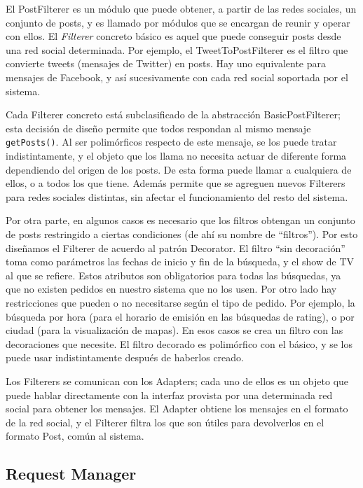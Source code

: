 El PostFilterer es un módulo que puede obtener, a partir de las redes sociales, un conjunto de posts, y es llamado por módulos que se encargan de reunir y operar con ellos. El \emph{Filterer} concreto básico es aquel que puede conseguir posts desde una red social determinada. Por ejemplo, el TweetToPostFilterer es el filtro que convierte tweets (mensajes de Twitter) en posts. Hay uno equivalente para mensajes de Facebook, y así sucesivamente con cada red social soportada por el sistema.

Cada Filterer concreto está subclasificado de la abstracción BasicPostFilterer; esta decisión de diseño permite que todos respondan al mismo mensaje \texttt{getPosts()}. Al ser polimórficos respecto de este mensaje, se los puede tratar indistintamente, y el objeto que los llama no necesita actuar de diferente forma dependiendo del origen de los posts. De esta forma puede llamar a cualquiera de ellos, o a todos los que tiene. Además permite que se agreguen nuevos Filterers para redes sociales distintas, sin afectar el funcionamiento del resto del sistema.
\medskip

Por otra parte, en algunos casos es necesario que los filtros obtengan un conjunto de posts restringido a ciertas condiciones (de ahí su nombre de ``filtros''). Por esto diseñamos el Filterer de acuerdo al patrón Decorator. El filtro ``sin decoración'' toma como parámetros las fechas de inicio y fin de la búsqueda, y el show de TV al que se refiere. Estos atributos son obligatorios para todas las búsquedas, ya que no existen pedidos en nuestro sistema que no los usen. Por otro lado hay restricciones que pueden o no necesitarse según el tipo de pedido. Por ejemplo, la búsqueda por hora (para el horario de emisión en las búsquedas de rating), o por ciudad (para la visualización de mapas). En esos casos se crea un filtro con las decoraciones que necesite. El filtro decorado es polimórfico con el básico, y se los puede usar indistintamente después de haberlos creado.
\medskip

Los Filterers se comunican con los Adapters; cada uno de ellos es un objeto que puede hablar directamente con la interfaz provista por una determinada red social para obtener los mensajes. El Adapter obtiene los mensajes en el formato de la red social, y el Filterer filtra los que son útiles para devolverlos en el formato Post, común al sistema.

\subsection{Request Manager}

